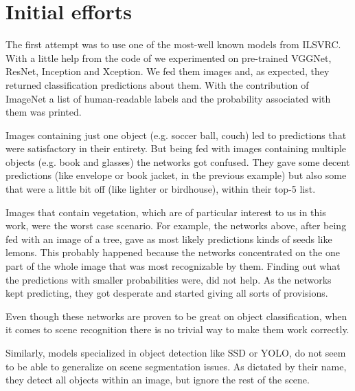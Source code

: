 \documentclass[12pt,a4paper]{report}
\newcommand{\acronym}{\MakeUppercase}
\begin{document}
	\section{Initial efforts}
	\label{sec:fg:ef}
	
	The first attempt was to use one of the most-well known models from \acronym{ilsvrc}. 
	With a little help from the code of \citet{Rosebrocke} we experimented on 
	pre-trained VGGNet, ResNet, Inception and Xception. We fed them images and, 
	as expected, they returned classification predictions about them. With the 
	contribution of ImageNet a list of human-readable labels and the probability 
	associated with them was printed.
	\par
	Images containing just one object (e.g. soccer ball, couch) led to predictions 
	that were satisfactory in their entirety. But being fed with images containing 
	multiple objects (e.g. book and glasses) the networks got confused. They gave 
	some decent predictions (like envelope or book jacket, in the previous example) 
	but also some that were a little bit off (like lighter or birdhouse), within 
	their top-5 list.
	\par
	Images that contain vegetation, which are of particular interest to us in this work, 
	were the worst case scenario. For example, the networks above, after being fed with 
	an image of a tree, gave as most likely predictions kinds of seeds like lemons. This 
	probably happened because the networks concentrated on the one part of the whole image 
	that was most recognizable by them. Finding out what the predictions with smaller 
	probabilities were, did not help. As the networks kept predicting, they got desperate 
	and started giving all sorts of provisions. 
	\par
	Even though these networks are proven to be great on object classification, when 
	it comes to scene recognition there is no trivial way to make them work correctly.
	\par
	Similarly, models specialized in object detection like \acronym{ssd} or \acronym{yolo}, 
	do not seem to be able to generalize on scene segmentation issues. As dictated by their 
	name, they detect all objects within an image, but ignore the rest of the scene.
	\\
	
\end{document}
